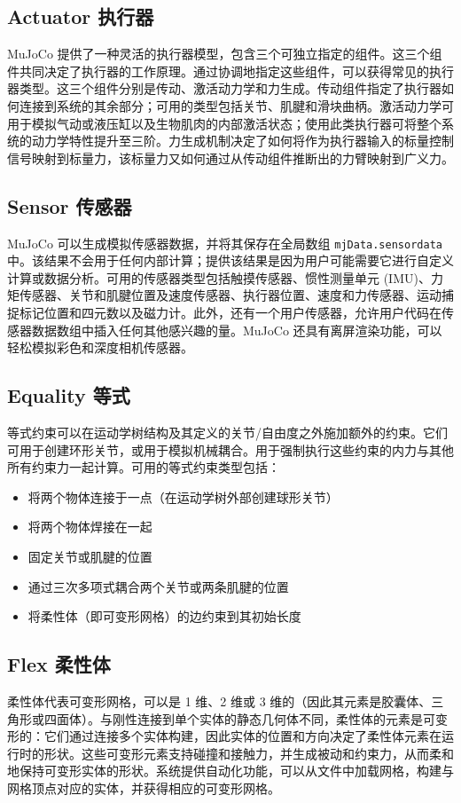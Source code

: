 \subsection{Actuator 执行器}
MuJoCo 提供了一种灵活的执行器模型，包含三个可独立指定的组件。这三个组件共同决定了执行器的工作原理。通过协调地指定这些组件，可以获得常见的执行器类型。这三个组件分别是传动、激活动力学和力生成。传动组件指定了执行器如何连接到系统的其余部分；可用的类型包括关节、肌腱和滑块曲柄。激活动力学可用于模拟气动或液压缸以及生物肌肉的内部激活状态；使用此类执行器可将整个系统的动力学特性提升至三阶。力生成机制决定了如何将作为执行器输入的标量控制信号映射到标量力，该标量力又如何通过从传动组件推断出的力臂映射到广义力。



\subsection{Sensor 传感器}
MuJoCo 可以生成模拟传感器数据，并将其保存在全局数组 \texttt{mjData.sensordata} 中。该结果不会用于任何内部计算；提供该结果是因为用户可能需要它进行自定义计算或数据分析。可用的传感器类型包括触摸传感器、惯性测量单元 (IMU)、力矩传感器、关节和肌腱位置及速度传感器、执行器位置、速度和力传感器、运动捕捉标记位置和四元数以及磁力计。此外，还有一个用户传感器，允许用户代码在传感器数据数组中插入任何其他感兴趣的量。MuJoCo 还具有离屏渲染功能，可以轻松模拟彩色和深度相机传感器。

\subsection{Equality 等式}
等式约束可以在运动学树结构及其定义的关节/自由度之外施加额外的约束。它们可用于创建环形关节，或用于模拟机械耦合。用于强制执行这些约束的内力与其他所有约束力一起计算。可用的等式约束类型包括：
\begin{itemize}
	\item 将两个物体连接于一点（在运动学树外部创建球形关节）
	\item 将两个物体焊接在一起
	\item 固定关节或肌腱的位置
	\item 通过三次多项式耦合两个关节或两条肌腱的位置
	\item 将柔性体（即可变形网格）的边约束到其初始长度
\end{itemize}

\subsection{Flex 柔性体}
柔性体代表可变形网格，可以是 1 维、2 维或 3 维的（因此其元素是胶囊体、三角形或四面体）。与刚性连接到单个实体的静态几何体不同，柔性体的元素是可变形的：它们通过连接多个实体构建，因此实体的位置和方向决定了柔性体元素在运行时的形状。这些可变形元素支持碰撞和接触力，并生成被动和约束力，从而柔和地保持可变形实体的形状。系统提供自动化功能，可以从文件中加载网格，构建与网格顶点对应的实体，并获得相应的可变形网格。

